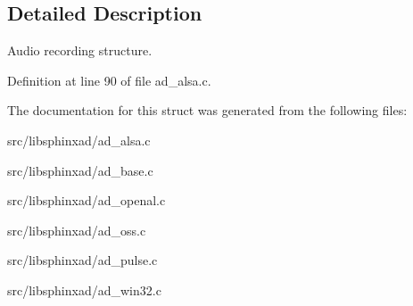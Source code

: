 \subsection{Detailed Description}
Audio recording structure. 

Definition at line 90 of file ad\+\_\+alsa.\+c.



The documentation for this struct was generated from the following files\+:\begin{DoxyCompactItemize}
\item 
src/libsphinxad/ad\+\_\+alsa.\+c\item 
src/libsphinxad/ad\+\_\+base.\+c\item 
src/libsphinxad/ad\+\_\+openal.\+c\item 
src/libsphinxad/ad\+\_\+oss.\+c\item 
src/libsphinxad/ad\+\_\+pulse.\+c\item 
src/libsphinxad/ad\+\_\+win32.\+c\end{DoxyCompactItemize}
